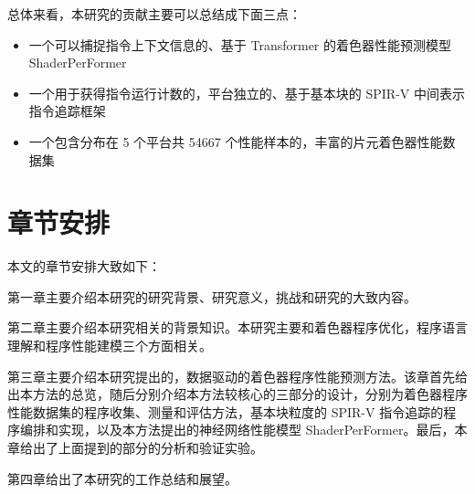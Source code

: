 
总体来看，本研究的贡献主要可以总结成下面三点：
\begin{itemize}
    \item 一个可以捕捉指令上下文信息的、基于 Transformer 的着色器性能预测模型 ShaderPerFormer
    \item 一个用于获得指令运行计数的，平台独立的、基于基本块的 SPIR-V 中间表示指令追踪框架
    \item 一个包含分布在 5 个平台共 54667 个性能样本的，丰富的片元着色器性能数据集
\end{itemize}

\section{章节安排}

本文的章节安排大致如下：

第一章主要介绍本研究的研究背景、研究意义，挑战和研究的大致内容。

第二章主要介绍本研究相关的背景知识。本研究主要和着色器程序优化，程序语言理解和程序性能建模三个方面相关。

第三章主要介绍本研究提出的，数据驱动的着色器程序性能预测方法。该章首先给出本方法的总览，随后分别介绍本方法较核心的三部分的设计，分别为着色器程序性能数据集的程序收集、测量和评估方法，基本块粒度的 SPIR-V 指令追踪的程序编排和实现，以及本方法提出的神经网络性能模型 ShaderPerFormer。最后，本章给出了上面提到的部分的分析和验证实验。

第四章给出了本研究的工作总结和展望。